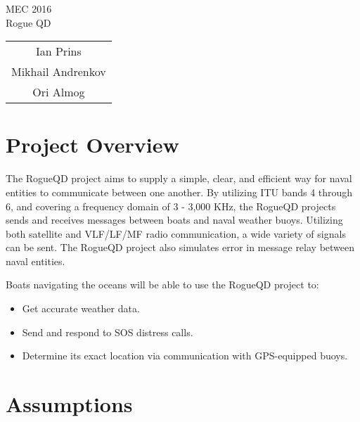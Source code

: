 \documentclass{article}
\begin{document}
\centering
\huge MEC 2016\\
\normalsize Rogue QD\\

\bigskip
\bigskip

%

\def \fsos {500\ }
\def \fdl {3\ }
\def \fdh {100\ }
\def \fbl {150\ }
\def \fbh {250\ }

\begin{tabular}{c}
	Ian Prins\\
	Mikhail Andrenkov\\
	Ori Almog\\
\end{tabular}

\newpage
\flushleft

\section{Project Overview} %

	The RogueQD project aims to supply a simple, clear, and efficient way for naval entities to communicate between one another. By utilizing ITU bands 4 through 6, and covering a frequency domain of 3 - 3,000 KHz, the RogueQD projects sends and receives messages between boats and naval weather buoys. Utilizing both satellite and VLF/LF/MF radio communication, a wide variety of signals can be sent. The RogueQD project also simulates error in message relay between naval entities.

	\bigskip

	Boats navigating the oceans will be able to use the RogueQD project to:

	\begin{itemize}
		\item Get accurate weather data.
		\item Send and respond to SOS distress calls.
		\item Determine its exact location via communication with GPS-equipped buoys. 
	\end{itemize}


\section{Assumptions} %
\end{document}
